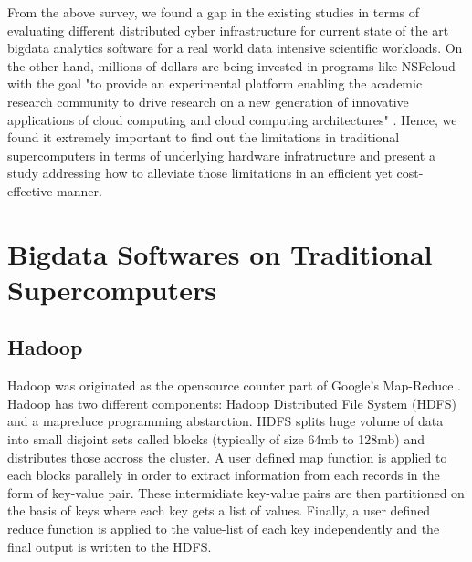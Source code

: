 \documentclass[conference]{IEEEtran}
\begin{document}
From the above survey, we found a gap in the existing studies in terms of evaluating different distributed cyber infrastructure for current state of the art bigdata analytics software for a real world data intensive scientific workloads.
On the other hand, millions of dollars are being invested in programs like NSFcloud with the goal "to provide an experimental platform enabling the academic research community to drive research on a new generation of innovative applications of cloud computing and cloud computing architectures" \cite{nsfcloud} . 
Hence, we found it extremely important to find out the limitations in traditional supercomputers in terms of underlying hardware infratructure and present a study addressing how to alleviate those limitations in an efficient yet cost-effective manner.



\section {Bigdata Softwares on Traditional Supercomputers} \label{Bigdata Softwares on Traditional Supercomputers}
\subsection {Hadoop}
Hadoop was originated as the opensource counter part of Google's Map-Reduce \cite{fw:mapreduce}.
Hadoop has two different components: Hadoop Distributed File System (HDFS) and a mapreduce programming abstarction.
HDFS splits huge volume of data into small disjoint sets called blocks (typically of size 64mb to 128mb) and distributes those accross the cluster.
A user defined map function is applied to each blocks parallely in order to extract information from each records in the form of key-value pair.
These intermidiate key-value pairs are then partitioned on the basis of keys where each key gets a list of values.
Finally, a user defined reduce function is applied to the value-list of each key independently and the final output is written to the HDFS.
 
\end{document}
